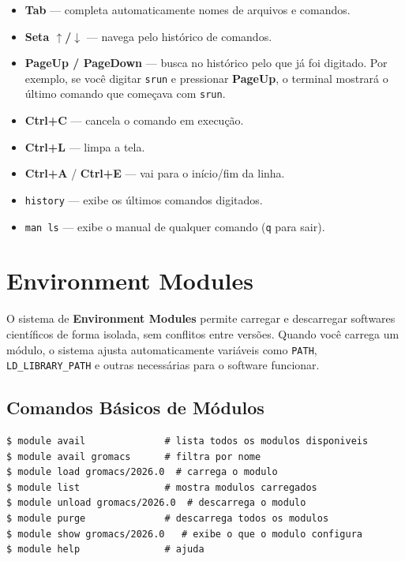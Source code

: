 \documentclass[11pt, a4paper]{article}
\newcommand{\cmd}[1]{\texttt{\textcolor{codeblue}{#1}}}
\begin{document}
\begin{dica}
\begin{itemize}[noitemsep]
  \item \textbf{Tab} --- completa automaticamente nomes de arquivos e comandos.
  \item \textbf{Seta $\uparrow$/$\downarrow$} --- navega pelo histórico de comandos.
  \item \textbf{PageUp / PageDown} --- busca no histórico pelo que já foi digitado.
        Por exemplo, se você digitar \texttt{srun} e pressionar \textbf{PageUp},
        o terminal mostrará o último comando que começava com \texttt{srun}.
  \item \textbf{Ctrl+C} --- cancela o comando em execução.
  \item \textbf{Ctrl+L} --- limpa a tela.
  \item \textbf{Ctrl+A} / \textbf{Ctrl+E} --- vai para o início/fim da linha.
  \item \cmd{history} --- exibe os últimos comandos digitados.
  \item \cmd{man ls} --- exibe o manual de qualquer comando (\texttt{q} para sair).
\end{itemize}
\end{dica}

\section{Environment Modules}
\label{sec:modulos}

O sistema de \textbf{Environment Modules} permite carregar e descarregar
softwares científicos de forma isolada, sem conflitos entre versões.
Quando você carrega um módulo, o sistema ajusta automaticamente variáveis
como \texttt{PATH}, \texttt{LD\_LIBRARY\_PATH} e outras necessárias para
o software funcionar.

\subsection{Comandos Básicos de Módulos}

\begin{lstlisting}[style=terminal]
$ module avail              # lista todos os modulos disponiveis
$ module avail gromacs      # filtra por nome
$ module load gromacs/2026.0  # carrega o modulo
$ module list               # mostra modulos carregados
$ module unload gromacs/2026.0  # descarrega o modulo
$ module purge              # descarrega todos os modulos
$ module show gromacs/2026.0   # exibe o que o modulo configura
$ module help               # ajuda
\end{lstlisting}
\end{document}
